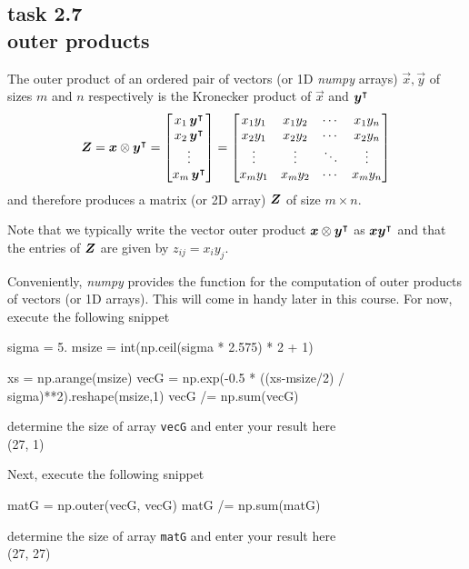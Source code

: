 
\subsection*{task 2.7 \\[1ex] outer products}

The outer product of an ordered pair of vectors (or 1D \emph{numpy} arrays) $\vec{x}, \vec{y}$ of sizes $m$ and $n$  respectively is the Kronecker product of $\vec{x}$ and $\bm{y}^\intercal$
\begin{equation*}
\bm{Z} = \bm{x} \otimes \bm{y}^\intercal
=
\begin{bmatrix}
x_1 \, \bm{y}^\intercal \\
x_2 \, \bm{y}^\intercal \\
\vdots \\
x_m \, \bm{y}^\intercal
\end{bmatrix}
=
\begin{bmatrix}
x_1 y_1 & x_1 y_2 & \cdots & x_1 y_n \\
x_2 y_1 & x_2 y_2 & \cdots & x_2 y_n \\
\vdots & \vdots & \ddots & \vdots \\
x_m y_1 & x_m y_2 & \cdots & x_m y_n \\
\end{bmatrix}
\end{equation*}
and therefore produces a matrix (or 2D array) $\bm{Z}$ of size $m \times n$.

Note that we typically write the vector outer product $\bm{x} \otimes \bm{y}^\intercal$ as $\bm{x} \bm{y}^\intercal$ and that the entries of $\bm{Z}$ are given by $z_{ij} = x_i y_j$.

Conveniently, \emph{numpy} provides the function  for the computation of outer products of vectors (or 1D arrays). This will come in handy later in this course. For now, execute the following snippet
\begin{python}
sigma = 5.
msize = int(np.ceil(sigma * 2.575) * 2 + 1)

xs    = np.arange(msize)
vecG  = np.exp(-0.5 * ((xs-msize/2) / sigma)**2).reshape(msize,1)
vecG /= np.sum(vecG)
\end{python}
determine the size of array \texttt{vecG} and enter your result here
\color{blue} \\[1ex]
(27, 1)
\color{black}



\vspace{1cm}
Next, execute the following snippet
\begin{python}
matG  = np.outer(vecG, vecG)
matG /= np.sum(matG)
\end{python}
determine the size of array \texttt{matG} and enter your result here
\color{blue} \\[1ex]
(27, 27)
\color{black}



